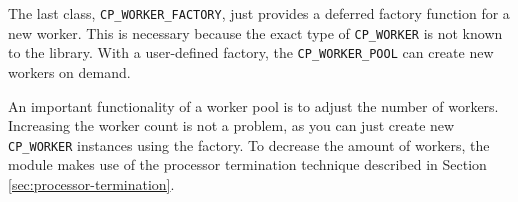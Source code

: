 The last class, \lstinline!CP_WORKER_FACTORY!, just provides a deferred factory function for a new worker.
This is necessary because the exact type of \lstinline!CP_WORKER! is not known to the library.
With a user-defined factory, the \lstinline!CP_WORKER_POOL! can create new workers on demand.





An important functionality of a worker pool is to adjust the number of workers.
Increasing the worker count is not a problem, as you can just create new \lstinline!CP_WORKER! instances using the factory.
To decrease the amount of workers, the module makes use of the processor termination technique described in Section \ref{sec:processor-termination}.


% 
% 
% 
% 
%   
%   
% 
% 
% 


